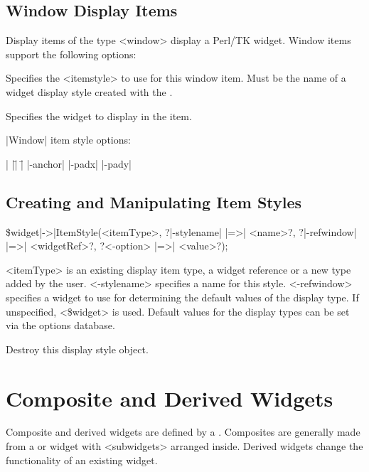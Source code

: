 \subsection*{Window Display Items}
Display items of the type <window> display
a Perl/TK widget. Window items support the following
options:

\begin{enum}{1cm}
Specifies the <itemstyle> to use for this window item. Must be the
name of a widget display style created with the .

Specifies the widget to display in the item.
\end{enum}

|Window| item style options:

\begin{tabbing}
|                    |\=|                    |\= \kill                    
|-anchor|       \> |-padx|  \> |-pady| \\
\end{tabbing}

\subsection*{Creating and Manipulating Item Styles}

\begin{enum}{1cm}
   \item[\quad \$widget|->|ItemStyle(<itemType>, ?|-stylename| |=>| <name>?,]
 ?|-refwindow| |=>| <widgetRef>?, ?<-option> |=>| <value>?);\strut\newline
<itemType> is an existing display item type, a widget reference
or a new type added by the user. <-stylename> specifies a name for this style.
<-refwindow> specifies a widget to use for determining the default
values of the display type. If unspecified, 
<\$widget> is used. Default values for the display
types can be set via the options database.

Destroy this display style object.
\end{enum}

\section{Composite and Derived Widgets}
\vspace{-4pt}
Composite and derived widgets are defined by a .
Composites are generally made from a 
or  widget
with <subwidgets> arranged inside.  Derived widgets change the functionality of an existing
widget.
\vskip5pt

